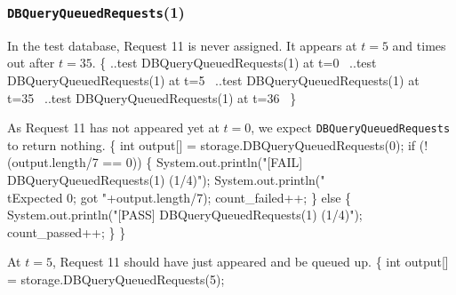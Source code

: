 \documentclass{article}
\def\nwendcode{\endtrivlist \endgroup}
\let\nwdocspar=\par
\begin{document}
\subsubsection{{\tt{}DBQueryQueuedRequests}(1)}
In the test database, Request 11 is never assigned. It appears
at $t=5$ and times out after $t=35$.
\nwenddocs{}\endmoddef{}
\{
  \LA{}..test \code{}DBQueryQueuedRequests\edoc{}(1) at t=0~{\nwtagstyle{}}\RA{}
  \LA{}..test \code{}DBQueryQueuedRequests\edoc{}(1) at t=5~{\nwtagstyle{}}\RA{}
  \LA{}..test \code{}DBQueryQueuedRequests\edoc{}(1) at t=35~{\nwtagstyle{}}\RA{}
  \LA{}..test \code{}DBQueryQueuedRequests\edoc{}(1) at t=36~{\nwtagstyle{}}\RA{}
\}
\nwendcode{}\nwdocspar
As Request 11 has not appeared yet at $t=0$, we expect
{\tt{}DBQueryQueuedRequests} to return nothing.
\nwenddocs{}\endmoddef{}
\{
  int output[] = storage.DBQueryQueuedRequests(0);
  if (!(output.length/7 == 0)) \{
    System.out.println("[FAIL] DBQueryQueuedRequests(1) (1/4)");
    System.out.println("\\tExpected 0; got "+output.length/7);
    count_failed++;
  \} else \{
    System.out.println("[PASS] DBQueryQueuedRequests(1) (1/4)");
    count_passed++;
  \}
\}
\nwendcode{}\nwdocspar
At $t=5$, Request 11 should have just appeared and be queued up.
\nwenddocs{}\endmoddef{}
\{
  int output[] = storage.DBQueryQueuedRequests(5);
\end{document}
